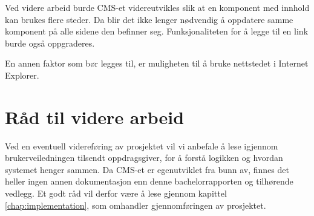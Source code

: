 Ved videre arbeid burde CMS-et videreutvikles slik at en komponent med innhold kan brukes flere steder. Da blir det ikke lenger nødvendig å oppdatere samme komponent på alle sidene den befinner seg. Funksjonaliteten for å legge til en link burde også oppgraderes.

En annen faktor som bør legges til, er muligheten til å bruke nettstedet i Internet Explorer.

\section{Råd til videre arbeid}
Ved en eventuell videreføring av prosjektet vil vi anbefale å lese igjennom brukerveiledningen tilsendt oppdragsgiver, for å forstå logikken og hvordan systemet henger sammen. Da CMS-et er egenutviklet fra bunn av, finnes det heller ingen annen dokumentasjon enn denne bachelorrapporten og tilhørende vedlegg. Et godt råd vil derfor være å lese gjennom kapittel \ref{chap:implementation}, som omhandler gjennomføringen av prosjektet.
